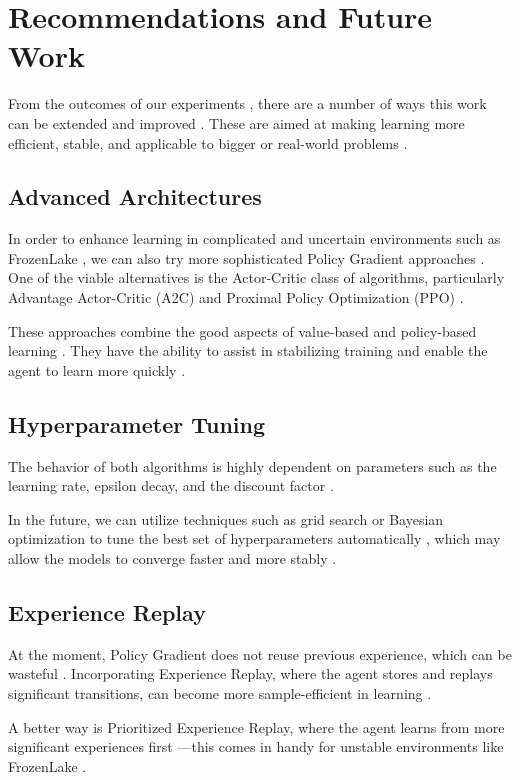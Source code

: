 \documentclass[conference]{IEEEtran}
\begin{document}
\section{Recommendations and Future Work}
From the outcomes of our experiments \cite{Henderson2018}, there are a number of ways this work can be extended and improved \cite{Arulkumaran2017}. These are aimed at making learning more efficient, stable, and applicable to bigger or real-world problems \cite{Glatt2016}.

\subsection{Advanced Architectures}
In order to enhance learning in complicated and uncertain environments such as FrozenLake \cite{Brockman2016}, we can also try more sophisticated Policy Gradient approaches \cite{Schulman2015}. One of the viable alternatives is the Actor-Critic class of algorithms, particularly Advantage Actor-Critic (A2C) and Proximal Policy Optimization (PPO) \cite{Degris2012}.

These approaches combine the good aspects of value-based and policy-based learning \cite{SuttonBarto2018}. They have the ability to assist in stabilizing training and enable the agent to learn more quickly \cite{Schulman2015}.

\subsection{Hyperparameter Tuning}
The behavior of both algorithms is highly dependent on parameters such as the learning rate, epsilon decay, and the discount factor \cite{Henderson2018}.

In the future, we can utilize techniques such as grid search or Bayesian optimization to tune the best set of hyperparameters automatically \cite{Thomas2016}, which may allow the models to converge faster and more stably \cite{Henderson2018}.

\subsection{Experience Replay}
At the moment, Policy Gradient does not reuse previous experience, which can be wasteful \cite{Mnih2015}. Incorporating Experience Replay, where the agent stores and replays significant transitions, can become more sample-efficient in learning \cite{schaul2015}.

A better way is Prioritized Experience Replay, where the agent learns from more significant experiences first \cite{schaul2015}—this comes in handy for unstable environments like FrozenLake \cite{Brockman2016}.
\end{document}
